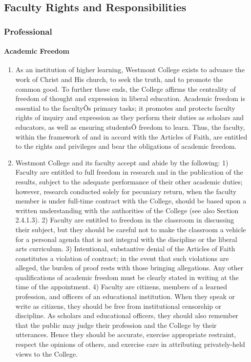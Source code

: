 \documentclass[letterpaper, 11pt]{article}
\begin{document}
	\subsection{Faculty Rights and Responsibilities}
		\subsubsection{Professional}
			\paragraph{Academic Freedom}
				\begin{enumerate}[label=\alph*)]
					\item{As an institution of higher learning, Westmont College exists to advance the work of Christ and His church, to seek the truth, and to promote the common good.  To further these ends, the College affirms the centrality of freedom of thought and expression in liberal education.  Academic freedom is essential to the facultyÕs primary tasks; it promotes and protects faculty rights of inquiry and expression as they perform their duties as scholars and educators, as well as ensuring studentsÕ freedom to learn.  Thus, the faculty, within the framework of and in accord with the Articles of Faith, are entitled to the rights and privileges and bear the obligations of academic freedom.}
					\item{Westmont College and its faculty accept and abide by the following:}
					1) Faculty are entitled to full freedom in research and in the publication of the results, subject to the adequate performance of their other academic duties; however, research conducted solely for pecuniary return, when the faculty member is under full-time contract with the College, should be based upon a written understanding with the authorities of the College (see also Section 2.4.1.3).
					2) Faculty are entitled to freedom in the classroom in discussing their subject, but they should be careful not to make the classroom a vehicle for a personal agenda that is not integral with the discipline or the liberal arts curriculum.
					3) Intentional, substantive denial of the Articles of Faith constitutes a violation of contract; in the event that such violations are alleged, the burden of proof rests with those bringing allegations.  Any other qualifications of academic freedom must be clearly stated in writing at the time of the appointment.
					4) Faculty are citizens, members of a learned profession, and officers of an educational institution.  When they speak or write as citizens, they should be free from institutional censorship or discipline.  As scholars and educational officers, they should also remember that the public may judge their profession and the College by their utterances.  Hence they should be accurate, exercise appropriate restraint, respect the opinions of others, and exercise care in attributing privately-held views to the College.
				\end{enumerate}
\end{document}
